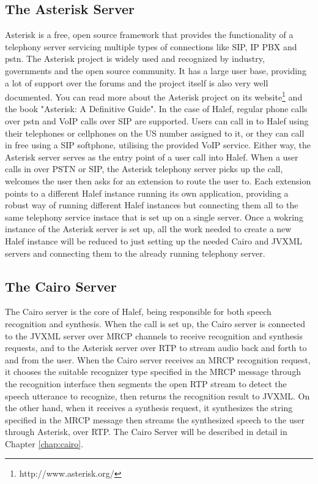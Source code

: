 \subsection{The Asterisk Server}
Asterisk is a free, open source framework that provides the functionality of a telephony server servicing multiple types of connections like SIP, IP PBX and \ac{pstn}.
The Asterisk project is widely used and recognized by industry, governments and the open source community.
It has a large user base, providing a lot of support over the forums and the project itself is also very well documented.
You can read more about the Asterisk project on its website\footnote{http://www.asterisk.org/} and the book "Asterisk: A Definitive Guide"\cite{asterisk}.
In the case of Halef, regular phone calls over \ac{pstn} and VoIP calls over SIP are supported.
Users can call in to Halef using their telephones or cellphones on the US number assigned to it, or they can call in free using a SIP softphone, utilising the provided VoIP service.
Either way, the Asterisk server serves as the entry point of a user call into Halef.
When a user calls in over PSTN or SIP, the Asterisk telephony server picks up the call, welcomes the user then asks for an extension to route the user to.
Each extension points to a different Halef instance running its own application, providing a robust way of running different Halef instances but connecting them all to the same telephony service instace that is set up on a single server.
Once a wokring instance of the Asterisk server is set up, all the work needed to create a new Halef instance will be reduced to just setting up the needed Cairo and JVXML servers and connecting them to the already running telephony server.

\subsection{The Cairo Server}
The Cairo server is the core of Halef, being responsible for both speech recognition and synthesis.
When the call is set up, the Cairo server is connected to the JVXML server over MRCP channels to receive recognition and synthesis requests, and to the Asterisk server over RTP to stream audio back and forth to and from the user.
When the Cairo server receives an MRCP recognition request, it chooses the suitable recognizer type specified in the MRCP message through the recognition interface then segments the open RTP stream to detect the speech utterance to recognize, then returns the recognition result to JVXML.
On the other hand, when it receives a synthesis request, it synthesizes the string specified in the MRCP message then streams the synthesized speech to the user through Asterisk, over RTP.
The Cairo Server will be described in detail in Chapter \ref{chap:cairo}.

